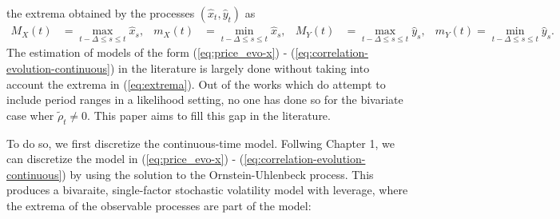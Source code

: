 \documentclass[10pt]{article}
\begin{document}
the extrema obtained by the processes $(\hat{x}_t, \hat{y}_t)$ as
\begin{align}
M_X(t) &=\max_{t-\Delta\leq s\leq t}\hat{x}_s, & m_X(t) &=\min_{t-\Delta\leq s\leq t}\hat{x}_s, &
M_Y(t) &=\max_{t-\Delta\leq s\leq t}\hat{y}_s, & m_Y(t)=\min_{t-\Delta \leq s\leq t}\hat{y}_s. \label{eq:extrema}
\end{align}
The estimation of models of the form (\ref{eq:price_evo-x}) -
(\ref{eq:correlation-evolution-continuous}) in the literature is
largely done without taking into account the extrema in
(\ref{eq:extrema}). Out of the works which do attempt to include
period ranges in a likelihood setting, no one has done so for the
bivariate case wher $\tilde{\rho}_t \neq 0$. This paper aims to fill
this gap in the literature.

To do so, we first discretize the continuous-time model. Follwing
Chapter 1, we can discretize the model in (\ref{eq:price_evo-x}) -
(\ref{eq:correlation-evolution-continuous}) by using the solution to
the Ornstein-Uhlenbeck process. This produces a bivaraite,
single-factor stochastic volatility model with leverage, where the
extrema of the observable processes are part of the model:
\end{document}
